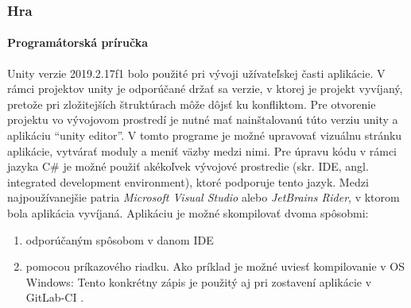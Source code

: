 \subsubsection{Hra}

\paragraph{Programátorská príručka}
Unity verzie 2019.2.17f1 bolo použité pri vývoji užívateľskej časti aplikácie.
V rámci projektov unity je odporúčané držať sa verzie, v ktorej je projekt vyvíjaný, pretože pri zložitejších
štruktúrach môže dôjsť ku konfliktom.
Pre otvorenie projektu vo vývojovom prostredí je nutné mať nainštalovanú túto verziu unity a aplikáciu
\enquote{unity editor}.
V tomto programe je možné upravovať vizuálnu stránku aplikácie, vytvárať moduly a meniť väzby medzi nimi.
Pre úpravu kódu v rámci jazyka C\# je možné použiť akékoľvek vývojové prostredie (skr. IDE, angl. integrated development
environment), ktoré podporuje tento jazyk.
Medzi najpoužívanejšie patria \emph{Microsoft Visual Studio} alebo \emph{JetBrains Rider}, v ktorom bola aplikácia
vyvíjaná.
Aplikáciu je možné skompilovať dvoma spôsobmi:
\begin{enumerate}
    \item odporúčaným spôsobom v danom IDE
    \item pomocou príkazového riadku.
    Ako príklad je možné uviesť kompilovanie v OS Windows:
    Tento konkrétny zápis je použitý aj pri zostavení aplikácie v GitLab-CI .
\end{enumerate}

